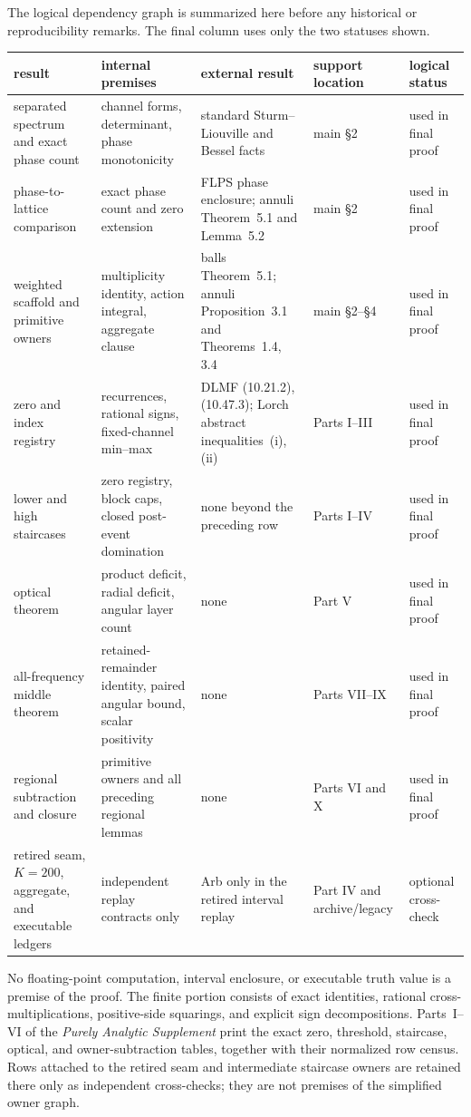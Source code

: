 \documentclass[11pt]{article}
\numberwithin{equation}{section}
\theoremstyle{definition}
\theoremstyle{remark}
\begin{document}
The logical dependency graph is summarized here before any historical or
reproducibility remarks.  The final column uses only the two statuses shown.
\begin{center}
\scriptsize
\renewcommand{\arraystretch}{1.14}
\setlength{\tabcolsep}{4pt}
\begin{tabular}{@{}p{2.7cm}p{3.5cm}p{3.5cm}p{2.0cm}p{2.2cm}@{}}
\toprule
result&internal premises&external result&support location&logical status\\
\midrule
separated spectrum and exact phase count&
channel forms, determinant, phase monotonicity&
standard Sturm--Liouville and Bessel facts&
main \S2&
used in final proof\\
phase-to-lattice comparison&
exact phase count and zero extension&
FLPS phase enclosure; annuli Theorem~5.1 and Lemma~5.2&
main \S2&
used in final proof\\
weighted scaffold and primitive owners&
multiplicity identity, action integral, aggregate clause&
balls Theorem~5.1; annuli Proposition~3.1 and Theorems~1.4, 3.4&
main \S2--\S4&
used in final proof\\
zero and index registry&
recurrences, rational signs, fixed-channel min--max&
DLMF (10.21.2), (10.47.3); Lorch abstract inequalities~(i), (ii)&
Parts I--III&
used in final proof\\
lower and high staircases&
zero registry, block caps, closed post-event domination&
none beyond the preceding row&
Parts I--IV&
used in final proof\\
optical theorem&
product deficit, radial deficit, angular layer count&
none&
Part V&
used in final proof\\
all-frequency middle theorem&
retained-remainder identity, paired angular bound, scalar positivity&
none&
Parts VII--IX&
used in final proof\\
regional subtraction and closure&
primitive owners and all preceding regional lemmas&
none&
Parts VI and X&
used in final proof\\
retired seam, \(K=200\), aggregate, and executable ledgers&
independent replay contracts only&
Arb only in the retired interval replay&
Part IV and archive/legacy&
optional cross-check\\
\bottomrule
\end{tabular}
\end{center}

No floating-point computation, interval enclosure, or executable truth value
is a premise of the proof.  The finite portion consists of exact identities,
rational cross-multiplications, positive-side squarings, and explicit sign
decompositions.  Parts~I--VI of the \emph{Purely Analytic Supplement} print
the exact zero, threshold, staircase, optical, and owner-subtraction tables,
together with their normalized row census.  Rows attached to the retired
seam and intermediate staircase owners are retained there only as independent
cross-checks; they are not premises of the simplified owner graph.
\end{document}
